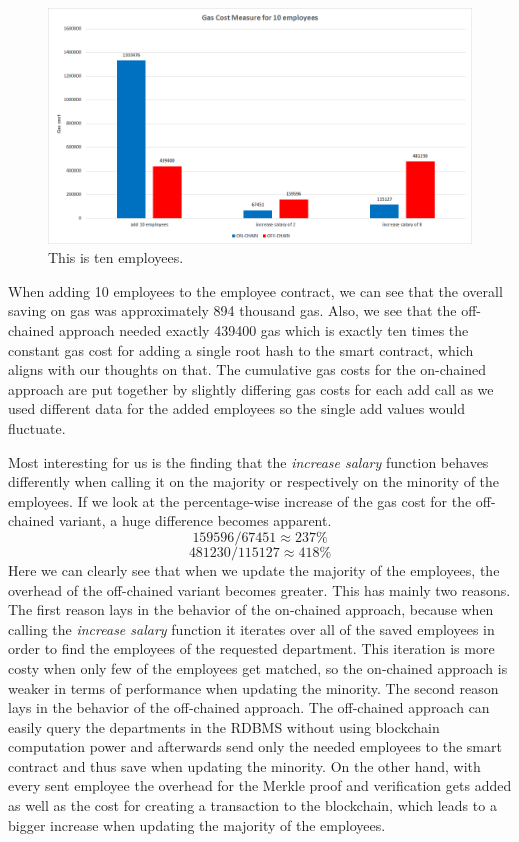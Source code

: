 \begin{figure}[t]%
\centering
\includegraphics[width=1.0\textwidth]{images/05_evaluation/05_gas_cost_ten.png}
\caption{\label{fig:05_gas_cost_ten}This is ten employees.}
\end{figure}

When adding 10 employees to the employee contract, we can see that the overall saving on gas was approximately 894 thousand gas.
Also, we see that the off-chained approach needed exactly 439400 gas which is exactly ten times the constant gas cost for adding a single root hash to the smart contract, which aligns with our thoughts on that.
The cumulative gas costs for the on-chained approach are put together by slightly differing gas costs for each add call as we used different data for the added employees so the single add values would fluctuate.

Most interesting for us is the finding that the \textit{increase salary} function behaves differently when calling it on the majority or respectively on the minority of the employees.
If we look at the percentage-wise increase of the gas cost for the off-chained variant, a huge difference becomes apparent.
$$ 159596 / 67451 \approx 237\% $$
$$ 481230 / 115127 \approx 418\% $$
Here we can clearly see that when we update the majority of the employees, the overhead of the off-chained variant becomes greater.
This has mainly two reasons.
The first reason lays in the behavior of the on-chained approach, because when calling the \textit{increase salary} function it iterates over all of the saved employees in order to find the employees of the requested department.
This iteration is more costy when only few of the employees get matched, so the on-chained approach is weaker in terms of performance when updating the minority.
The second reason lays in the behavior of the off-chained approach.
The off-chained approach can easily query the departments in the RDBMS without using blockchain computation power and afterwards send only the needed employees to the smart contract and thus save when updating the minority.
On the other hand, with every sent employee the overhead for the Merkle proof and verification gets added as well as the cost for creating a transaction to the blockchain, which leads to a bigger increase when updating the majority of the employees.


